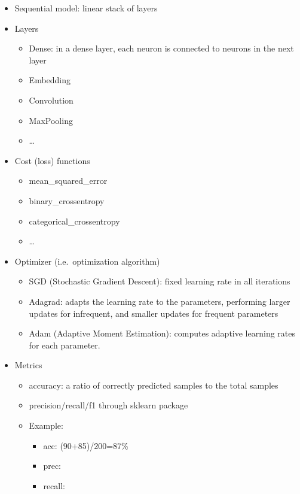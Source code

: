 \documentclass[11pt]{article}
\providecommand{\tightlist}{%
      \setlength{\itemsep}{0pt}\setlength{\parskip}{0pt}}
\begin{document}
\begin{itemize}
\tightlist
\item
  Sequential model: linear stack of layers
\item
  Layers

  \begin{itemize}
  \tightlist
  \item
    Dense: in a dense layer, each neuron is connected to neurons in the
    next layer
  \item
    Embedding
  \item
    Convolution
  \item
    MaxPooling
  \item
    \ldots{}
  \end{itemize}
\item
  Cost (loss) functions

  \begin{itemize}
  \tightlist
  \item
    mean\_squared\_error
  \item
    binary\_crossentropy
  \item
    categorical\_crossentropy
  \item
    \ldots{}
  \end{itemize}
\item
  Optimizer (i.e.~optimization algorithm)

  \begin{itemize}
  \tightlist
  \item
    SGD (Stochastic Gradient Descent): fixed learning rate in all
    iterations
  \item
    Adagrad: adapts the learning rate to the parameters, performing
    larger updates for infrequent, and smaller updates for frequent
    parameters
  \item
    Adam (Adaptive Moment Estimation): computes adaptive learning rates
    for each parameter.
  \end{itemize}
\item
  Metrics

  \begin{itemize}
  \tightlist
  \item
    accuracy: a ratio of correctly predicted samples to the total
    samples
  \item
    precision/recall/f1 through sklearn package
  \item
    Example:

    \begin{itemize}
    \tightlist
    \item
      acc: (90+85)/200=87\%
    \item
      prec:
    \item
      recall:
    \end{itemize}
  \end{itemize}
\end{itemize}
\end{document}
